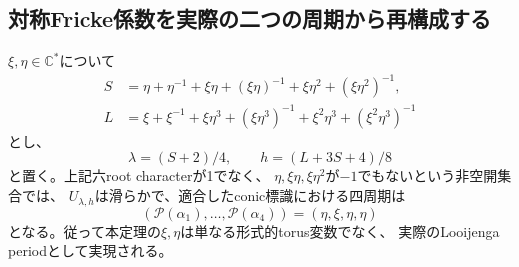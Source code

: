 \subsection{対称Fricke係数を実際の二つの周期から再構成する}
\begin{theorem}[対称族の周期による有理式]
\label{thm:symmetric-period-reconstruction}
$\xi,\eta\in\mathbb C^*$について
\begin{align*}
 S&=\eta+\eta^{-1}+\xi\eta+(\xi\eta)^{-1}
                  +\xi\eta^2+(\xi\eta^2)^{-1},\\
 L&=\xi+\xi^{-1}+\xi\eta^3+(\xi\eta^3)^{-1}
                  +\xi^2\eta^3+(\xi^2\eta^3)^{-1}
\end{align*}
とし、
\begin{equation}\label{eq:symmetric-period-reconstruction}
 \lambda=(S+2)/4,\qquad h=(L+3S+4)/8
\end{equation}
と置く。上記六root characterが1でなく、
$\eta,\xi\eta,\xi\eta^2$が$-1$でもないという非空開集合では、
$U_{\lambda,h}$は滑らかで、適合したconic標識における四周期は
\[
 (\mathcal P(\alpha_1),\ldots,\mathcal P(\alpha_4))
       =(\eta,\xi,\eta,\eta)
\]
となる。従って本定理の$\xi,\eta$は単なる形式的torus変数でなく、
実際のLooijenga periodとして実現される。
\end{theorem}
